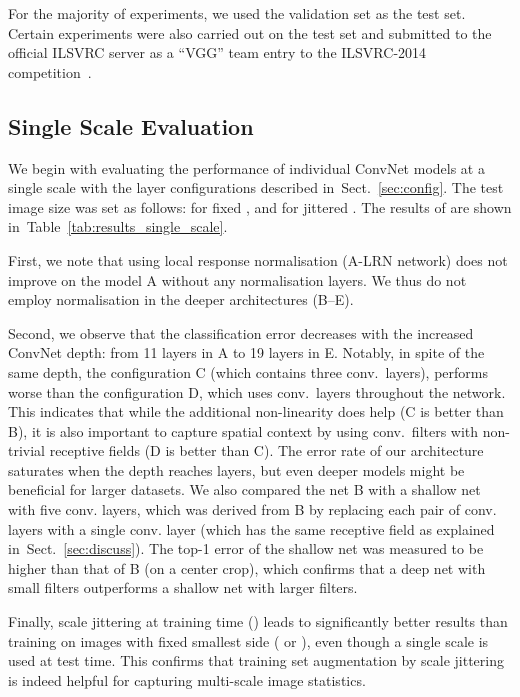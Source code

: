 \documentclass{article} \usepackage{iclr2015,times}
\newcommand{\tblref}[1]{Table~\ref{#1}}
\newcommand{\sref}[1]{Sect.~\ref{#1}}
\begin{document}
For the majority of experiments, we used the validation set as the test set. Certain experiments were also carried out on the test set and submitted to the official ILSVRC server 
as a ``VGG'' team entry to the ILSVRC-2014 competition~\citep{Russakovsky14}.

\subsection{Single Scale Evaluation}

We begin with evaluating the performance of individual ConvNet models at a single scale with the layer configurations described in~\sref{sec:config}.
The test image size was set as follows:  for fixed , and  for jittered .
The results of are shown in~\tblref{tab:results_single_scale}.

First, we note that using local response normalisation (A-LRN network) does not improve on the model A
without any normalisation layers. We thus do not employ normalisation in the deeper architectures (B--E).

Second, we observe that the classification error decreases with the increased ConvNet depth: from 11 layers in A to 19 layers in E.
Notably, in spite of the same depth, the configuration C (which contains three  conv.\ layers), performs worse than
the configuration D, which uses  conv.\ layers throughout the network.
This indicates that while the additional non-linearity does help (C is better than B), it is also important to capture spatial context by using conv.\ filters with non-trivial receptive fields (D is better than C). 
The error rate of our architecture saturates when the depth reaches  layers, but even deeper models might be beneficial for larger datasets.
We also compared the net B with a shallow net with five  conv. layers, which was derived from B by replacing 
each pair of  conv. layers with a single  conv. layer (which has the same receptive field as explained in~\sref{sec:discuss}).
The top-1 error of the shallow net was measured to be  higher than that of B (on a center crop), which confirms that a deep net with small 
filters outperforms a shallow net with larger filters. 

Finally, scale jittering at training time () leads to significantly better results than training on images with fixed smallest side ( or ),
even though a single scale is used at test time. This confirms that training set augmentation by scale jittering is indeed helpful for capturing multi-scale image statistics.
\end{document}
